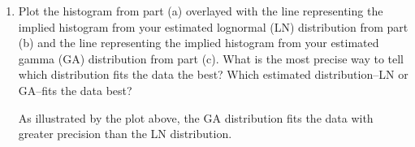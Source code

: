 \documentclass[letterpaper,12pt]{article}
\theoremstyle{definition}
\begin{document}
\begin{enumerate}
\begin{enumerate}
\item Plot the histogram from part (a) overlayed with the line representing the implied histogram from your estimated lognormal (LN) distribution from part (b) and the line representing the implied histogram from your estimated gamma (GA) distribution from part (c). What is the most precise way to tell which distribution fits the data the best? Which estimated distribution--LN or GA--fits the data best?
\par
\begin{figure}[H]\centering\captionsetup{width=4.0in}
\end{figure}
\par
As illustrated by the plot above, the GA distribution fits the data with greater precision than the LN distribution.
\bigskip


\end{enumerate}
\end{enumerate}
\end{document}
